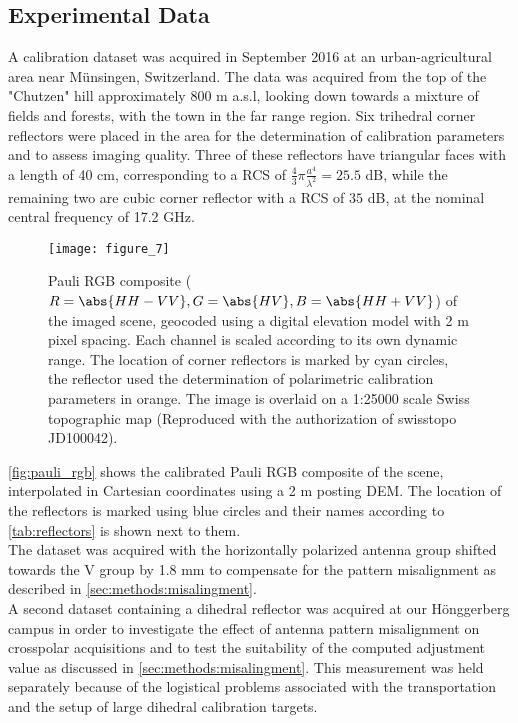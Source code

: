 \subsection{Experimental Data}\label{sec:methods:data}
A calibration dataset was acquired in September 2016 at an urban-agricultural area near M\"{u}nsingen, Switzerland. The data was acquired from the top of the "Chutzen" hill approximately 800 m a.s.l, looking down towards a mixture of fields and forests, with the town in the far range region. Six trihedral corner reflectors were placed in the area for the determination of calibration parameters and to assess imaging quality. Three of these reflectors have triangular faces with a length of 40 cm, corresponding to a RCS of $\frac{4}{3}\pi \frac{a^4}{\lambda^2}=25.5 $ dB, while the remaining two are cubic corner reflector with a RCS of $35$ dB, at the nominal central frequency of 17.2 GHz.
	\begin{figure}
		\centering
		\texttt{[image: figure\_7]}
		\caption{Pauli RGB composite ($R=\abs{HH-VV},G=\abs{HV},B=\abs{HH+VV}$) of the imaged scene, geocoded using a digital elevation model with 2 m pixel spacing. Each channel is scaled according to its own dynamic range. The location of corner reflectors is marked by cyan circles, the reflector used the determination of polarimetric calibration parameters in orange. The image is overlaid on a 1:25000 scale Swiss topographic map (Reproduced with the authorization of swisstopo  JD100042).}
		\label{fig:pauli_rgb}
	\end{figure}
\autoref{fig:pauli_rgb} shows the calibrated Pauli RGB composite of the scene, interpolated in Cartesian coordinates using a 2 m posting DEM.  The location of the reflectors  is marked using blue circles and their names according to \autoref{tab:reflectors} is shown next to them.\\
The dataset was acquired with the horizontally polarized antenna group shifted towards the V group by 1.8 mm to compensate for the pattern misalignment as described in \autoref{sec:methods:misalingment}.\\
A second dataset containing a dihedral reflector was acquired at our H\"{o}nggerberg campus in order to investigate the effect of antenna pattern misalignment on crosspolar acquisitions and to test the suitability of the computed adjustment value as discussed in \autoref{sec:methods:misalingment}. This measurement was held separately because of the logistical problems associated with the transportation and the setup of large dihedral calibration targets.

